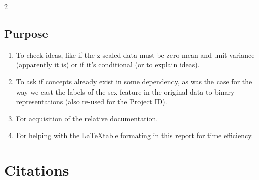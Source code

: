 \documentclass[12pt, a4paper]{article}
\begin{document}
\begin{multicols}{2}
    \subsection{Purpose} \label{subsec:llmUse}

    \begin{enumerate} \label{enm:llm}
        \item To check ideas, like if the z-scaled data must be zero mean and unit variance (apparently it is) or if it's conditional (or to explain ideas).
        \item To ask if concepts already exist in some dependency, as was the case for the way we cast the labels of the sex feature in the original data to binary representations (also re-used for the Project ID).
        \item For acquisition of the relative documentation.
        \item For helping with the \LaTeX table formating in this report for time efficiency.
    \end{enumerate}

    \section{Citations} \label{sec:citations}

    

\end{multicols}
\end{document}
